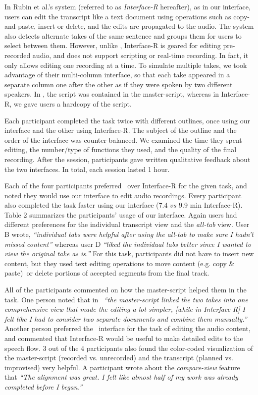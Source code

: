 In Rubin et al.'s system (referred to as
\textit{Interface-R} hereafter), as in our interface, users
can edit the transcript like a text document using operations
such as copy-and-paste, insert or delete, and the edits are propagated
to the audio. The system  also detects alternate takes of the
same sentence and groups them for users to select between them.
However, unlike \systemname , Interface-R is geared for editing pre-recorded
audio, and does not support scripting or real-time recording.
In fact, it only allows editing one recording at a time. To simulate multiple takes, we took advantage of their multi-column interface, so that each take appeared in a separate column one after the other as if they were spoken by two different speakers. In \systemname,  the script was contained in the master-script, whereas in Interface-R, we gave users a hardcopy of the script.

Each participant completed the task twice with different outlines,
once using our interface and the other using Interface-R.
The subject of the outline and the order of the interface was
counter-balanced. We examined the time they spent editing,
the number/type of functions they used, and the quality of the
final recording. After the session, participants gave written
qualitative feedback about the two interfaces. In total, each
session lasted 1 hour.
   
Each of the four participants preferred \systemname\ over Interface-R for the given task, and noted they would use
our interface to edit audio recordings. Every participant also
completed the task faster using our interface (7.4 $vs$ 9.9 min Interface-R). 
Table 2 summarizes the participants' usage of our interface. Again users had different preferences for the individual transcript view and the \textit{all-tab} view. User B wrote,  \textit{``individual tabs were helpful after using the all-tab to make sure I hadn't missed content''} whereas user D \textit{``liked the individual tabs better since I wanted to view the original take as is.''} For this task, participants did not have to insert new content, but they used text editing operations to move content (e.g. copy \& paste)\ or delete portions of accepted segments from the final track.   


All of the participants commented on how the master-script helped them in the task. One person noted that in \systemname\ \textit{``the master-script linked the two takes into one comprehensive view
that made the editing a lot simpler, [while in Interface-R] I felt like I had to consider two separate documents and combine them manually.''} Another person preferred the \systemname\ interface for the task of editing the audio content, and commented that Interface-R would be useful to make detailed edits to the speech flow. 3 out of the 4 participants also found the color-coded visualization of the master-script (recorded vs. unrecorded) and the transcript (planned vs. improvised) very helpful. A participant wrote about the \textit{compare-view} feature that \textit{``The alignment was great. I felt like almost half of my work was
already completed before I began.''} 



